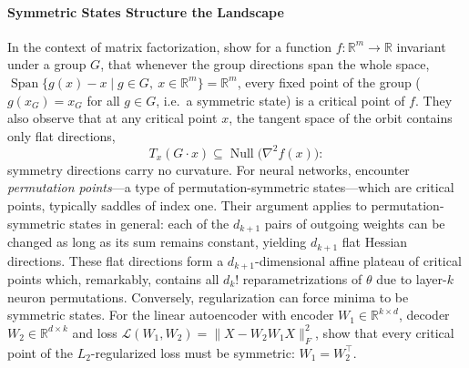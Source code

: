 \documentclass[mathematics,review,submit,moreauthors]{Definitions/mdpi}
\begin{document}
\paragraph{Symmetric States Structure the Landscape}
In the context of matrix factorization, \citet{li2018} show for a function $f:\mathbb{R}^m\to\mathbb{R}$ invariant under a group $G$, that whenever the group directions span the whole space, $\operatorname{Span}\{g(x)-x \mid g\in G,\ x\in\mathbb{R}^m\}=\mathbb{R}^m$, every fixed point of the group ($g(x_G)=x_G$ for all $g\in G$, i.e.\ a symmetric state) is a critical point of $f$.
They also observe that at any critical point $x$, the tangent space of the orbit contains only flat directions,
\begin{equation*}
    T_x(G\cdot x)\subseteq\operatorname{Null}\big(\nabla^2 f(x)\big):
\end{equation*}
symmetry directions carry no curvature.
For neural networks, \citet{brea2019} encounter \emph{permutation points}---a type of permutation-symmetric states---which are critical points, typically saddles of index one.
Their argument applies to permutation-symmetric states in general: each of the $d_{k+1}$ pairs of outgoing weights can be changed as long as its sum remains constant, yielding $d_{k+1}$ flat Hessian directions.
These flat directions form a $d_{k+1}$-dimensional affine plateau of critical points which, remarkably, contains all $d_k!$ reparametrizations of $\theta$ due to layer-$k$ neuron permutations.
Conversely, regularization can force minima to be symmetric states.
For the linear autoencoder with encoder $W_1\in\mathbb{R}^{k\times d}$, decoder $W_2\in\mathbb{R}^{d\times k}$ and loss $\mathcal{L}(W_1,W_2)=\lVert X-W_2W_1X\rVert_F^2$, \citet{kunin2019p3icml} show that every critical point of the $L_2$-regularized loss must be symmetric: $W_1=W_2^{\top}$.
\end{document}

